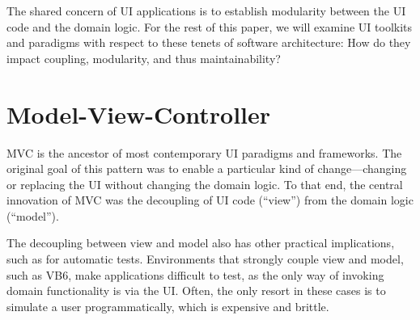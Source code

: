 \documentclass[sigplan,screen]{acmart}
\begin{document}
The shared concern of UI applications is to establish modularity
between the UI code and the domain logic.  For the rest of this paper, we will examine UI toolkits and paradigms
with respect to these tenets of software architecture: How do they
impact coupling, modularity, and thus maintainability?  


\section{Model-View-Controller}
\label{sec:mvc}
  

MVC is the ancestor of most contemporary UI paradigms and frameworks.
The original goal of this pattern was to enable a particular kind of
change---changing or replacing the UI without changing the domain
logic.  To that end, the central innovation of MVC was the decoupling
of UI code (``view'') from the domain logic (``model'').

The decoupling between view and model also has other practical
implications, such as for automatic tests.  Environments that
strongly couple view and model, such as VB6, make applications
difficult to test, as the only way of invoking domain
functionality is via the UI.
Often, the only resort in these cases is to simulate a user
programmatically, which is expensive and brittle.
\end{document}
